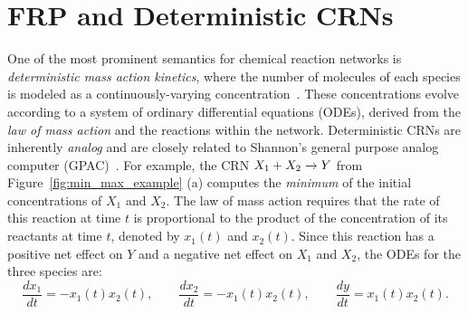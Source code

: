 
\section{FRP and Deterministic CRNs}
\label{sec:frp_dcrns}

One of the most prominent semantics for chemical reaction networks is \emph{deterministic mass action kinetics}, where the number of molecules of each species is modeled as a continuously-varying concentration~\cite{oErdTot89,oEpsPoj98,oGuna03,oLent15}.
These concentrations evolve according to a system of ordinary differential equations (ODEs), derived from the \emph{law of mass action} and the reactions within the network.
Deterministic CRNs are inherently \emph{analog} and are closely related to Shannon's general purpose analog computer (GPAC)~\cite{jShan41,jGraCos03,jGrac04,cBoGrPo16,cFLBP17,rtcrn2}.
For example, the CRN \( X_1 + X_2 \xrightarrow{} Y \) from Figure~\ref{fig:min_max_example} (a) computes the \emph{minimum} of the initial concentrations of \( X_1 \) and \( X_2 \).
The law of mass action requires that the rate of this reaction at time \( t \) is proportional to the product of the concentration of its reactants at time \( t \), denoted by \( x_1(t) \) and \( x_2(t) \).
Since this reaction has a positive net effect on \( Y \) and a negative net effect on \( X_1 \) and \( X_2 \), the ODEs for the three species are:
\[
    \frac{dx_1}{dt} = -x_1(t)x_2(t), \qquad
    \frac{dx_2}{dt} = -x_1(t)x_2(t), \qquad
    \frac{dy}{dt}   =  x_1(t)x_2(t).
\]

